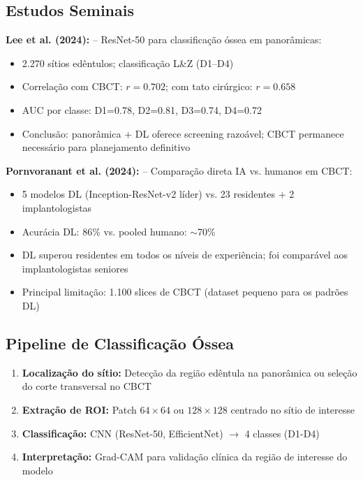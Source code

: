 \subsection{Estudos Seminais}

\textbf{Lee et al. (2024):}  -- ResNet-50 para classificação
óssea em panorâmicas:
\begin{itemize}
  \item 2.270 sítios edêntulos; classificação L\&Z (D1--D4)
  \item Correlação com CBCT: $r = 0.702$; com tato cirúrgico: $r = 0.658$
  \item AUC por classe: D1=0.78, D2=0.81, D3=0.74, D4=0.72
  \item Conclusão: panorâmica + DL oferece screening razoável; CBCT permanece
        necessário para planejamento definitivo
\end{itemize}

\textbf{Pornvoranant et al. (2024):}  -- Comparação direta
IA vs. humanos em CBCT:
\begin{itemize}
  \item 5 modelos DL (Inception-ResNet-v2 líder) vs. 23 residentes + 2 implantologistas
  \item Acurácia DL: 86\% vs. pooled humano: $\sim$70\%
  \item DL superou residentes em todos os níveis de experiência; foi comparável
        aos implantologistas seniores
  \item Principal limitação: 1.100 slices de CBCT (dataset pequeno para os padrões DL)
\end{itemize}

\subsection{Pipeline de Classificação Óssea}

\begin{enumerate}
  \item \textbf{Localização do sítio:} Detecção da região edêntula na panorâmica ou
        seleção do corte transversal no CBCT
  \item \textbf{Extração de ROI:} Patch $64\times64$ ou $128\times128$ centrado
        no sítio de interesse
  \item \textbf{Classificação:} CNN (ResNet-50, EfficientNet) $\to$ 4 classes (D1-D4)
  \item \textbf{Interpretação:} Grad-CAM para validação clínica da região de
        interesse do modelo
\end{enumerate}

